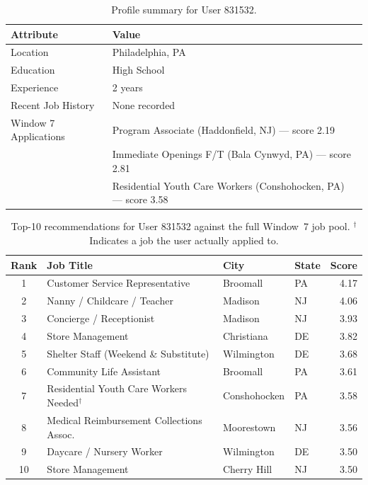 \begin{table}[H]
    \centering
    \caption{Profile summary for User 831532.}
    \label{tab:user831532_profile}
    \small
    \begin{tabular}{ll}
        \toprule
        \textbf{Attribute} & \textbf{Value} \\
        \midrule
        Location            & Philadelphia, PA \\
        Education           & High School \\
        Experience          & 2 years \\
        Recent Job History  & None recorded \\
        Window 7 Applications & Program Associate (Haddonfield, NJ) — score 2.19 \\
                              & Immediate Openings F/T (Bala Cynwyd, PA) — score 2.81 \\
                              & Residential Youth Care Workers (Conshohocken, PA) — score 3.58 \\
        \bottomrule
    \end{tabular}
\end{table}
 
\begin{table}[H]
    \centering
    \caption{Top-10 recommendations for User 831532 against the full Window~7 job pool. $^\dagger$Indicates a job the user actually applied to.}
    \label{tab:user831532_recs}
    \small
    \begin{tabular}{clll r}
        \toprule
        \textbf{Rank} & \textbf{Job Title} & \textbf{City} & \textbf{State} & \textbf{Score} \\
        \midrule
        1  & Customer Service Representative          & Broomall      & PA & 4.17 \\
        2  & Nanny / Childcare / Teacher              & Madison       & NJ & 4.06 \\
        3  & Concierge / Receptionist                 & Madison       & NJ & 3.93 \\
        4  & Store Management                         & Christiana    & DE & 3.82 \\
        5  & Shelter Staff (Weekend \& Substitute)    & Wilmington    & DE & 3.68 \\
        6  & Community Life Assistant                 & Broomall      & PA & 3.61 \\
        7  & Residential Youth Care Workers Needed$^\dagger$ & Conshohocken & PA & 3.58 \\
        8  & Medical Reimbursement Collections Assoc. & Moorestown   & NJ & 3.56 \\
        9  & Daycare / Nursery Worker                 & Wilmington    & DE & 3.50 \\
        10 & Store Management                         & Cherry Hill   & NJ & 3.50 \\
        \bottomrule
    \end{tabular}
\end{table}

